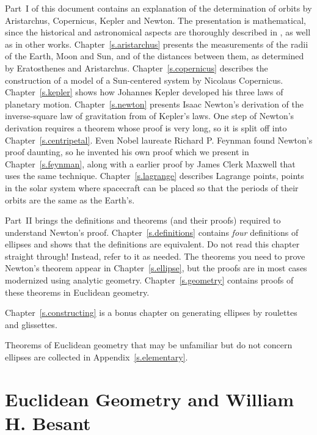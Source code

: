 Part~I of this document contains an explanation of the determination of orbits by Aristarchus, Copernicus, Kepler and Newton. The presentation is mathematical, since the historical and astronomical aspects are thoroughly described in \cite{hahn-cic}, as well as in other works. Chapter~\ref{s.aristarchus} presents the measurements of the radii of the Earth, Moon and Sun, and of the distances between them, as determined by Eratosthenes and Aristarchus. Chapter~\ref{s.copernicus} describes the construction of a model of a Sun-centered system by Nicolaus Copernicus. Chapter~\ref{s.kepler} shows how Johannes Kepler developed his three laws of planetary motion. Chapter~\ref{s.newton} presents Isaac Newton's derivation of the inverse-square law of gravitation from of Kepler's laws. One step of Newton's derivation requires a theorem whose proof is very long, so it is split off into Chapter~\ref{s.centripetal}. Even Nobel laureate Richard P. Feynman found Newton's proof daunting, so he invented his own proof which we present in Chapter~\ref{s.feynman}, along with a earlier proof by James Clerk Maxwell that uses the same technique. Chapter~\ref{s.lagrange} describes Lagrange points, points in the solar system where spacecraft can be placed so that the periods of their orbits are the same as the Earth's.

Part~II brings the definitions and theorems (and their proofs) required to understand Newton's proof. Chapter~\ref{s.definitions} contains \emph{four} definitions of ellipses and shows that the definitions are equivalent. Do not read this chapter straight through! Instead, refer to it as needed. The theorems you need to prove Newton's theorem appear in Chapter~\ref{s.ellipse}, but the proofs are in most cases modernized using analytic geometry.  Chapter~\ref{s.geometry} contains proofs of these theorems in Euclidean geometry.

Chapter~\ref{s.constructing} is a bonus chapter on generating ellipses by roulettes and glissettes.

Theorems of Euclidean geometry that may be unfamiliar but do not concern ellipses are collected in Appendix~\ref{s.elementary}. 

\section*{Euclidean Geometry and William H. Besant}

